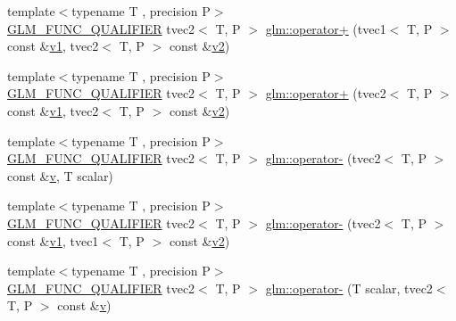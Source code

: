\begin{DoxyCompactItemize}
\item 
{\footnotesize template$<$typename T , precision P$>$ }\\\mbox{\hyperlink{setup_8hpp_a33fdea6f91c5f834105f7415e2a64407}{G\+L\+M\+\_\+\+F\+U\+N\+C\+\_\+\+Q\+U\+A\+L\+I\+F\+I\+ER}} tvec2$<$ T, P $>$ \mbox{\hyperlink{namespaceglm_a9e0d018443dab07ed4bb9da37cf0f9ba}{glm\+::operator+}} (tvec1$<$ T, P $>$ const \&\mbox{\hyperlink{glad_8h_a0779c3b73f9aa3a0ac5b0139b5d291d9}{v1}}, tvec2$<$ T, P $>$ const \&\mbox{\hyperlink{glad_8h_a9a09a1837922b2b806f4589096a52049}{v2}})
\item 
{\footnotesize template$<$typename T , precision P$>$ }\\\mbox{\hyperlink{setup_8hpp_a33fdea6f91c5f834105f7415e2a64407}{G\+L\+M\+\_\+\+F\+U\+N\+C\+\_\+\+Q\+U\+A\+L\+I\+F\+I\+ER}} tvec2$<$ T, P $>$ \mbox{\hyperlink{namespaceglm_ae1b3aefc72a348ddfb35c17711b7432c}{glm\+::operator+}} (tvec2$<$ T, P $>$ const \&\mbox{\hyperlink{glad_8h_a0779c3b73f9aa3a0ac5b0139b5d291d9}{v1}}, tvec2$<$ T, P $>$ const \&\mbox{\hyperlink{glad_8h_a9a09a1837922b2b806f4589096a52049}{v2}})
\item 
{\footnotesize template$<$typename T , precision P$>$ }\\\mbox{\hyperlink{setup_8hpp_a33fdea6f91c5f834105f7415e2a64407}{G\+L\+M\+\_\+\+F\+U\+N\+C\+\_\+\+Q\+U\+A\+L\+I\+F\+I\+ER}} tvec2$<$ T, P $>$ \mbox{\hyperlink{namespaceglm_a94306ca193aa584c2d8e958b34dafe3d}{glm\+::operator-\/}} (tvec2$<$ T, P $>$ const \&\mbox{\hyperlink{glad_8h_a14cfbe2fc2234f5504618905b69d1e06}{v}}, T scalar)
\item 
{\footnotesize template$<$typename T , precision P$>$ }\\\mbox{\hyperlink{setup_8hpp_a33fdea6f91c5f834105f7415e2a64407}{G\+L\+M\+\_\+\+F\+U\+N\+C\+\_\+\+Q\+U\+A\+L\+I\+F\+I\+ER}} tvec2$<$ T, P $>$ \mbox{\hyperlink{namespaceglm_a7119e325396231388c629c2d78c1bd19}{glm\+::operator-\/}} (tvec2$<$ T, P $>$ const \&\mbox{\hyperlink{glad_8h_a0779c3b73f9aa3a0ac5b0139b5d291d9}{v1}}, tvec1$<$ T, P $>$ const \&\mbox{\hyperlink{glad_8h_a9a09a1837922b2b806f4589096a52049}{v2}})
\item 
{\footnotesize template$<$typename T , precision P$>$ }\\\mbox{\hyperlink{setup_8hpp_a33fdea6f91c5f834105f7415e2a64407}{G\+L\+M\+\_\+\+F\+U\+N\+C\+\_\+\+Q\+U\+A\+L\+I\+F\+I\+ER}} tvec2$<$ T, P $>$ \mbox{\hyperlink{namespaceglm_a880f5b9369b72f912e07ef97cc82448b}{glm\+::operator-\/}} (T scalar, tvec2$<$ T, P $>$ const \&\mbox{\hyperlink{glad_8h_a14cfbe2fc2234f5504618905b69d1e06}{v}})

\end{DoxyCompactItemize}
